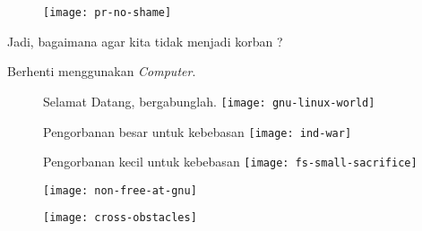 \documentclass[notes]{beamer}       %
\begin{document}
\begin{frame}
  \begin{figure}
    \centering
    \texttt{[image: pr-no-shame]}
  \end{figure}
\end{frame}

\begin{frame}
  \begin{center}
    \Huge Jadi, bagaimana agar kita tidak menjadi korban ?
  \end{center}
\end{frame}

\begin{frame}
  \color{red}
  \begin{center}
    \Huge Berhenti menggunakan \textit{Computer}.
  \end{center}
\end{frame}

\begin{frame}
  \begin{figure}
    \centering
    \large Selamat Datang, bergabunglah.
    \texttt{[image: gnu-linux-world]}
  \end{figure}
\end{frame}

\begin{frame}
  \begin{figure}
    \centering
    \large Pengorbanan besar untuk kebebasan
    \texttt{[image: ind-war]}
  \end{figure}
\end{frame}

\begin{frame}
  \begin{figure}
    \centering
    \large Pengorbanan kecil untuk kebebasan
    \texttt{[image: fs-small-sacrifice]}
  \end{figure}
\end{frame}

\begin{frame}
  \begin{figure}
    \centering
    \texttt{[image: non-free-at-gnu]}
  \end{figure}
\end{frame}

\begin{frame}
  \begin{figure}
    \centering
    \texttt{[image: cross-obstacles]}
  \end{figure}
\end{frame}
\end{document}
